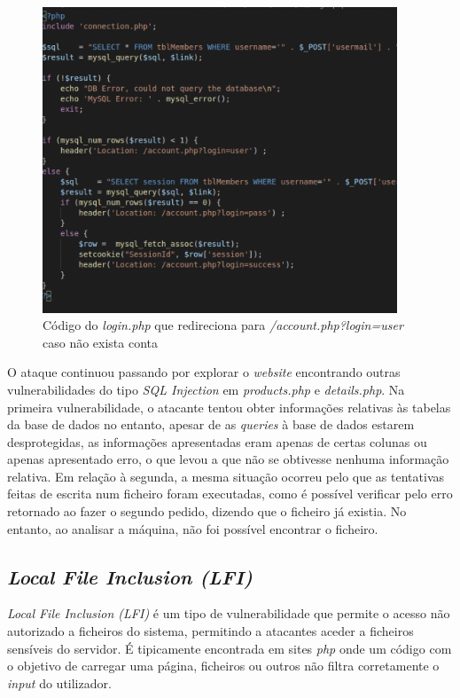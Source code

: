 \documentclass[10pt,english]{article}
\begin{document}
\begin{figure}[h]
    \centering
    \includegraphics[width=400]{images/loginphp.png}
    \caption{Código do \textit{login.php} que redireciona para \textit{/account.php?login=user} caso não exista conta}
\end{figure}

\par O ataque continuou passando por explorar o \textit{website} encontrando outras vulnerabilidades do tipo \textit{SQL Injection} em \textit{products.php} e \textit{details.php}. Na primeira vulnerabilidade, o atacante tentou obter informações relativas às tabelas da base de dados no entanto, apesar de as \textit{queries} à base de dados estarem desprotegidas, as informações apresentadas eram apenas de certas colunas ou apenas apresentado erro, o que levou a que não se obtivesse nenhuma informação relativa. Em relação à segunda, a mesma situação ocorreu pelo que as tentativas feitas de escrita num ficheiro foram executadas, como é possível verificar pelo erro retornado ao fazer o segundo pedido, dizendo que o ficheiro já existia. No entanto, ao analisar a máquina, não foi possível encontrar o ficheiro. 

\subsection{\textit{Local File Inclusion (LFI)}}

\par \textit{Local File Inclusion (LFI)} é um tipo de vulnerabilidade que permite o acesso não autorizado a ficheiros do sistema, permitindo a atacantes aceder a ficheiros sensíveis do servidor. É tipicamente encontrada em sites \textit{php} onde um código com o objetivo de carregar uma página, ficheiros ou outros não filtra corretamente o \textit{input} do utilizador.
\end{document}
